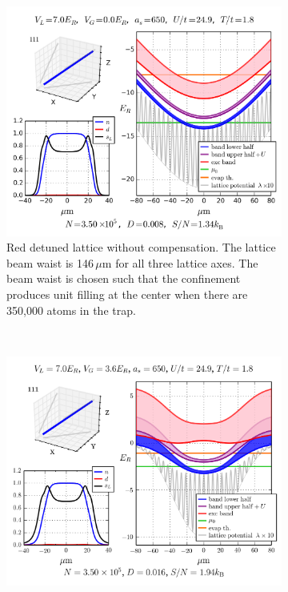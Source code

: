 \documentclass[11pt,letter]{article}
\begin{document}
\begin{figure}
        \centering
        \begin{subfigure}[t]{0.48\textwidth}
		\includegraphics[width=\textwidth]{figures/7Er_red-detuned_no-comp.png}
\caption{Red detuned lattice without compensation.  The lattice beam waist is
146\,$\mu$m for all three lattice axes.  The beam waist is chosen such that the
confinement produces unit filling at the center when there are 350,000 atoms in
the trap. }
                \label{fig:HTSE_full-band-profiles_a}
        \end{subfigure}%
        ~~ %
        \begin{subfigure}[t]{0.48\textwidth}
		\includegraphics[width=\textwidth]{figures/ir47-gr40_7Er-comp3p642.png}

\end{subfigure}
\end{figure}
\end{document}
